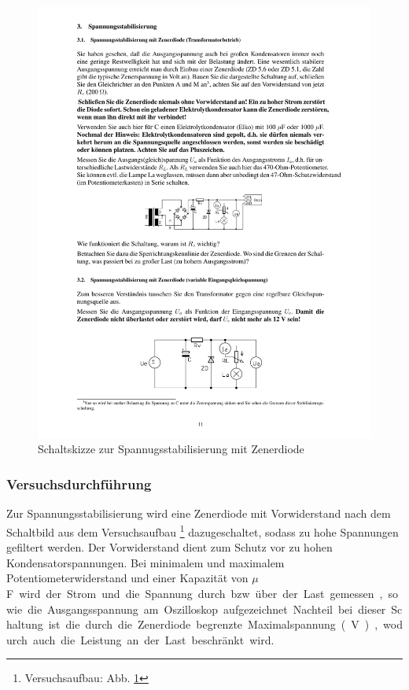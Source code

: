 \documentclass[12pt,a4paper]{article}
\begin{document}
\begin{figure}[H] 
  \centering
    \includegraphics[trim = 10mm 130mm 10mm 120mm, clip, scale = 1]{ep2_14[Page11].pdf}
  	\caption[Schaltskizze zur Spannugsstabilisierung mit Zenerdiode]{Schaltskizze zur Spannugsstabilisierung mit Zenerdiode\footnotemark}
  \label{fig:2_8}
\end{figure}

\subsubsection{Versuchsdurchführung}
Zur Spannungsstabilisierung wird eine Zenerdiode mit Vorwiderstand nach dem Schaltbild aus dem Versuchsaufbau \footnote{Versuchsaufbau: Abb. \ref{fig:2_8}} dazugeschaltet, sodass zu hohe Spannungen gefiltert werden. Der Vorwiderstand dient zum Schutz vor zu hohen Kondensatorspannungen. Bei minimalem und maximalem Potentiometerwiderstand und einer Kapazität von \unit[1000]{$\mu$F} wird der Strom und die Spannung durch bzw. über der Last gemessen, sowie die Ausgangsspannung am Oszilloskop aufgezeichnet. Nachteil bei dieser Schaltung ist die durch die Zenerdiode begrenzte Maximalspannung (\unit[5,1]{V}), wodurch auch die Leistung an der Last beschränkt wird.
\end{document}
